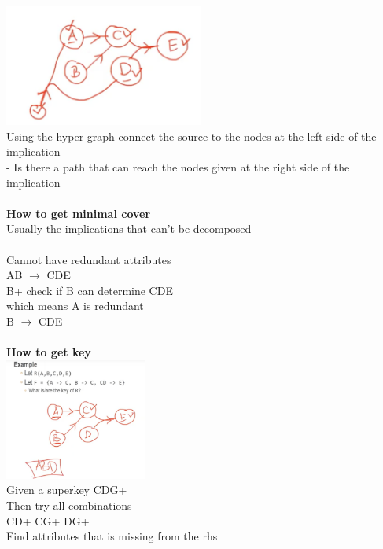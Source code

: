 \documentclass[11pt]{article}
\begin{document}
\includegraphics[height=4cm]{images/ss}
\\
Using the hyper-graph connect the source to the nodes at the left side of the implication\\
- Is there a path that can reach the nodes given at the right side of the implication
\\\\
\textbf{How to get minimal cover}\\
Usually the implications that can't be decomposed\\\\
Cannot have redundant attributes\\
AB $\rightarrow$ CDE\\
B+ check if B can determine CDE\\
which means A is redundant\\
B $\rightarrow$ CDE
\\\\
\textbf{How to get key}\\
\includegraphics[height=4cm]{images/sss}
\\
Given a superkey
CDG+\\
Then try all combinations\\
CD+ CG+ DG+\\
Find attributes that is missing from the rhs
\end{document}
